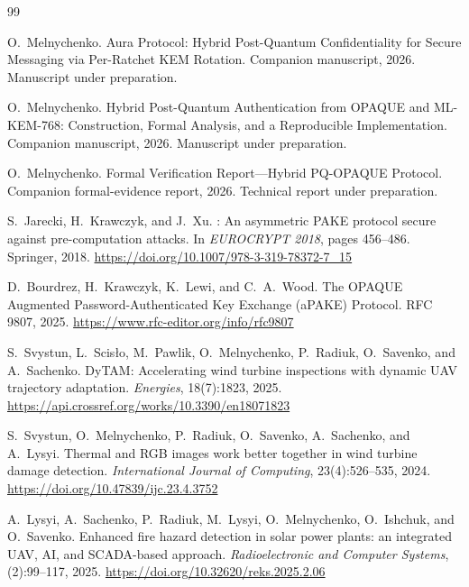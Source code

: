 \documentclass[preprint,12pt]{elsarticle}
\theoremstyle{definition}
\begin{document}

\begin{thebibliography}{99}

O.~Melnychenko.
\newblock Aura Protocol: Hybrid Post-Quantum Confidentiality for Secure
Messaging via Per-Ratchet KEM Rotation.
\newblock Companion manuscript, 2026.
\newblock Manuscript under preparation.

O.~Melnychenko.
\newblock Hybrid Post-Quantum Authentication from OPAQUE and ML-KEM-768:
Construction, Formal Analysis, and a Reproducible Implementation.
\newblock Companion manuscript, 2026.
\newblock Manuscript under preparation.

O.~Melnychenko.
\newblock Formal Verification Report---Hybrid PQ-OPAQUE Protocol.
\newblock Companion formal-evidence report, 2026.
\newblock Technical report under preparation.

S.~Jarecki, H.~Krawczyk, and J.~Xu.
: An asymmetric {PAKE} protocol secure against
pre-computation attacks.
\newblock In \emph{EUROCRYPT 2018}, pages 456--486. Springer, 2018.
\newblock \url{https://doi.org/10.1007/978-3-319-78372-7_15}

D.~Bourdrez, H.~Krawczyk, K.~Lewi, and C.~A.~Wood.
\newblock The {OPAQUE} Augmented Password-Authenticated Key Exchange
({aPAKE}) Protocol.
\newblock RFC 9807, 2025.
\newblock \url{https://www.rfc-editor.org/info/rfc9807}

S.~Svystun, L.~Scis{\l}o, M.~Pawlik, O.~Melnychenko, P.~Radiuk,
O.~Savenko, and A.~Sachenko.
\newblock DyTAM: Accelerating wind turbine inspections with dynamic UAV
trajectory adaptation.
\newblock \emph{Energies}, 18(7):1823, 2025.
\newblock \url{https://api.crossref.org/works/10.3390/en18071823}

S.~Svystun, O.~Melnychenko, P.~Radiuk, O.~Savenko, A.~Sachenko, and
A.~Lysyi.
\newblock Thermal and RGB images work better together in wind turbine damage
detection.
\newblock \emph{International Journal of Computing}, 23(4):526--535, 2024.
\newblock \url{https://doi.org/10.47839/ijc.23.4.3752}

A.~Lysyi, A.~Sachenko, P.~Radiuk, M.~Lysyi, O.~Melnychenko, O.~Ishchuk,
and O.~Savenko.
\newblock Enhanced fire hazard detection in solar power plants: an integrated
UAV, AI, and SCADA-based approach.
\newblock \emph{Radioelectronic and Computer Systems}, (2):99--117, 2025.
\newblock \url{https://doi.org/10.32620/reks.2025.2.06}


\end{thebibliography}
\end{document}
